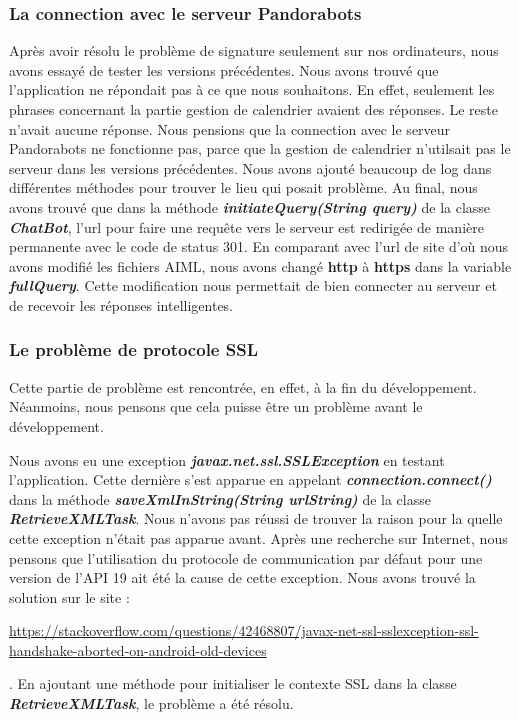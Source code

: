\subsubsection{La connection avec le serveur Pandorabots}

\indent Après avoir résolu le problème de signature seulement sur nos ordinateurs, nous avons essayé de tester les versions précédentes. Nous avons trouvé que l'application ne répondait pas à ce que nous souhaitons. En effet, seulement les phrases concernant la partie gestion de calendrier avaient des réponses. Le reste n'avait aucune réponse. Nous pensions que la connection avec le serveur Pandorabots ne fonctionne pas, parce que la gestion de calendrier n'utilsait pas le serveur dans les versions précédentes. Nous avons ajouté beaucoup de log dans différentes méthodes pour trouver le lieu qui posait problème. Au final, nous avons trouvé que dans la méthode \textbf{\emph{initiateQuery(String query)}} de la classe \textbf{\emph{ChatBot}}, l'url pour faire une requête vers le serveur est redirigée de manière permanente avec le code de status 301. En comparant avec l'url de site d'où nous avons modifié les fichiers AIML, nous avons changé \textbf{http} à \textbf{https} dans la variable \textbf{\emph{fullQuery}}. Cette modification nous permettait de bien connecter au serveur et de recevoir les réponses intelligentes.

\subsubsection{Le problème de protocole SSL}

\indent Cette partie de problème est rencontrée, en effet, à la fin du développement. Néanmoins, nous pensons que cela puisse être un problème avant le développement.

\indent Nous avons eu une exception \textbf{\emph{javax.net.ssl.SSLException}} en testant l'application. Cette dernière s'est apparue en appelant \textbf{\emph{connection.connect()}} dans la méthode \textbf{\emph{saveXmlInString(String urlString)}} de la classe \textbf{\emph{RetrieveXMLTask}}. Nous n'avons pas réussi de trouver la raison pour la quelle cette exception n'était pas apparue avant. Après une recherche sur Internet, nous pensons que l'utilisation du protocole de communication par défaut pour une version de l'API 19 ait été la cause de cette exception. Nous avons trouvé la solution sur le site : \begin{scriptsize} \url{https://stackoverflow.com/questions/42468807/javax-net-ssl-sslexception-ssl-handshake-aborted-on-android-old-devices}\end{scriptsize}. En ajoutant une méthode pour initialiser le contexte SSL dans la classe \textbf{\emph{RetrieveXMLTask}}, le problème a été résolu.

